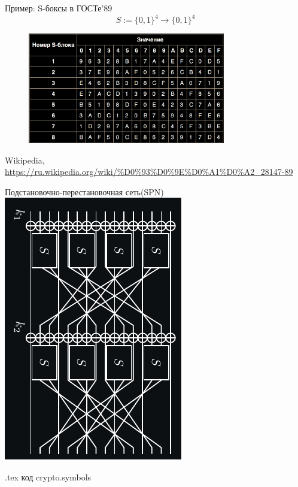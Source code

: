 \documentclass[usenames,dvipsnames,8pt,aspectratio=169]{beamer}
\begin{document}
\begin{frame}{Пример: S-боксы в ГОСТе'89}
	\Large
	\[
	S:= \{0,1\}^4 \rightarrow \{0,1\}^4
	\]
	
	\begin{figure}
		\includegraphics[width=0.77\textwidth]{Sbox_GOST}
			\hspace{5em}
	\end{figure}
\vfill
\small
{\color{gray} {Wikipedia, \url{https://ru.wikipedia.org/wiki/\%D0\%93\%D0\%9E\%D0\%A1\%D0\%A2_28147-89}}} 
\end{frame}



\begin{frame}{Подстановочно-перестановочная сеть(SPN)}
\centering
{}
\includegraphics[height=\textheight, angle=90, origin=c]{SPN}

\vfill
\small
{\color{gray} {.tex код crypto.symbols}} 

\end{frame}
\end{document}
